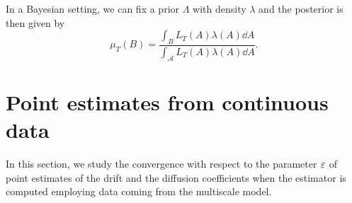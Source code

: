 \documentclass[10pt]{article}
\begin{document}
In a Bayesian setting, we can fix a prior $\Lambda$ with density $\lambda$ and the posterior is then given by
\begin{equation}
	\mu_T(B) = \frac{\int_B L_T(A) \lambda(A) \dd A}{\int_{\mathcal A} L_T(A) \lambda(A) \dd A}.
\end{equation}

\section{Point estimates from continuous data}

In this section, we study the convergence with respect to the parameter $\varepsilon$ of point estimates of the drift and the diffusion coefficients when the estimator is computed employing data coming from the multiscale model.
\end{document}

